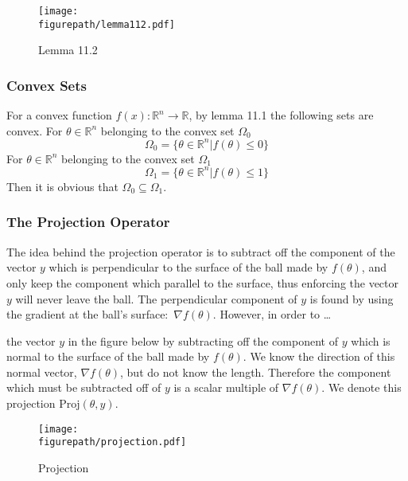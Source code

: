 \begin{figure}[H]
  \begin{center}
    \texttt{[image: \\figurepath/lemma112.pdf]}
    \caption{Lemma 11.2}
  \end{center}
\end{figure}

\subsubsection{Convex Sets}

For a convex function $f(x):\mathbb{R}^{n}\rightarrow\mathbb{R}$, by lemma 11.1 the following sets are convex.
For $\theta\in\mathbb{R}^{n}$ belonging to the convex set $\Omega_{0}$
\begin{equation*}
  \Omega_{0}=\{\theta\in\mathbb{R}^{n}|f(\theta)\leq0\}
\end{equation*}
For $\theta\in\mathbb{R}^{n}$ belonging to the convex set $\Omega_{1}$
\begin{equation*}
  \Omega_{1}=\{\theta\in\mathbb{R}^{n}|f(\theta)\leq1\}
\end{equation*}
Then it is obvious that $\Omega_{0}\subseteq\Omega_{1}$.

\subsubsection{The Projection Operator}

The idea behind the projection operator is to subtract off the component of the vector $y$ which is perpendicular to the surface of the ball made by $f(\theta)$, and only keep the component which parallel to the surface, thus enforcing the vector $y$ will never leave the ball.
The perpendicular component of $y$ is found by using the gradient at the ball's surface:\ $\nabla f(\theta)$.
However, in order to \ldots

the vector $y$ in the figure below by subtracting off the component of $y$ which is normal to the surface of the ball made by $f(\theta)$.
We know the direction of this normal vector, $\nabla f(\theta)$, but do not know the length.
Therefore the component which must be subtracted off of $y$ is a scalar multiple of $\nabla f(\theta)$.
We denote this projection $\text{Proj}(\theta,y)$.

\begin{figure}[H]
  \begin{center}
    \texttt{[image: \\figurepath/projection.pdf]}
    \caption{Projection}
  \end{center}
\end{figure}

